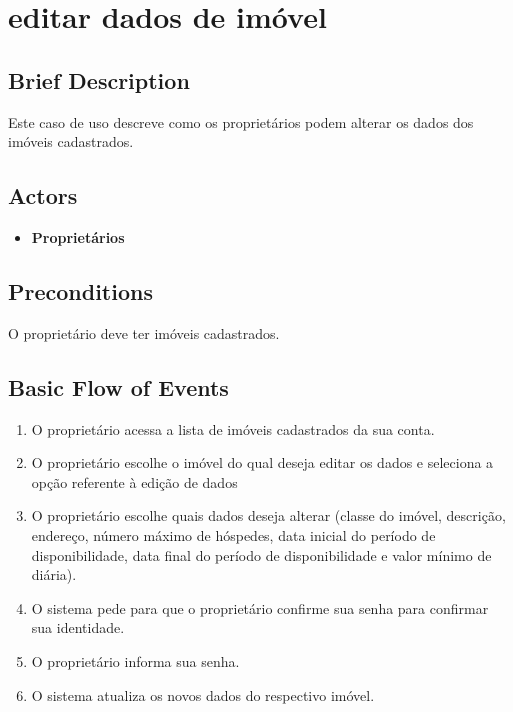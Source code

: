 \section{editar dados de imóvel}

\subsection*{Brief Description}
Este caso de uso descreve como os proprietários podem alterar os dados dos imóveis
cadastrados.

\subsection*{Actors}

\begin{itemize}
    \item \textbf{Proprietários}
\end{itemize}

\subsection*{Preconditions}
O proprietário deve ter imóveis cadastrados.

\subsection*{Basic Flow of Events}

\begin{enumerate}
    \item  O proprietário acessa a lista de imóveis cadastrados da sua conta.
    \item O proprietário escolhe o imóvel do qual deseja editar os dados e seleciona a opção referente à
    edição de dados
    \item O proprietário escolhe quais dados deseja alterar (classe do imóvel, descrição, endereço, número
    máximo de hóspedes, data inicial do período de disponibilidade, data final do período de
    disponibilidade e valor mínimo de diária).
    \item O sistema pede para que o proprietário confirme sua senha para confirmar sua identidade.
    \item O proprietário informa sua senha.
    \item O sistema atualiza os novos dados do respectivo imóvel.
\end{enumerate}

